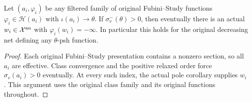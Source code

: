 \begin{corollary}
\label{cor:fp-eventual-approximant-poles}
\leanok
{}
Let $(a_i,\varphi_i)$ be any filtered family of original Fubini--Study
functions $\varphi_i\in\mathcal H(a_i)$ with
$\iota(a_i)\to\theta$.  If $\sigma^-_v(\theta)>0$, then eventually
there is an actual $w_i\in\mathcal X^{\mathrm{an}}$ with
$\varphi_i(w_i)=-\infty$.  In particular this holds for the original
decreasing net defining any $\theta$-psh function.
\end{corollary}
\begin{proof}
Each original Fubini--Study presentation contains a nonzero section,
so all $a_i$ are effective.  Class convergence and the positive relaxed
order force $\sigma_v(a_i)>0$ eventually.  At every such index,
the actual pole corollary supplies $w_i$.  This argument uses the
original class family and its original functions throughout.
\end{proof}
